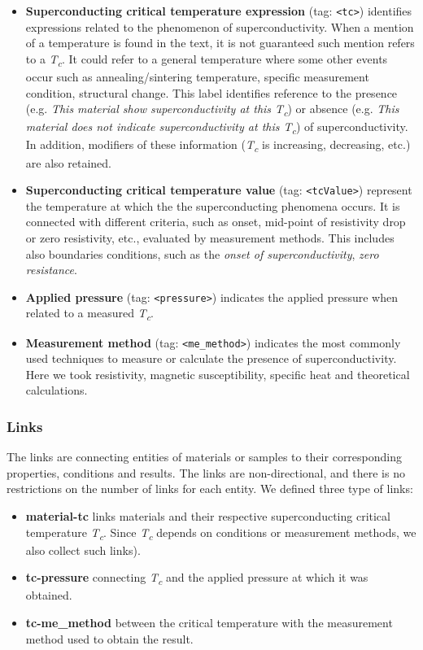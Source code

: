 \documentclass[fleqn,10pt]{wlscirep}
\begin{document}
\begin{itemize}
\item \textbf{Superconducting critical temperature expression} (tag: \texttt{<tc>}) identifies expressions related to the phenomenon of superconductivity. When a mention of a temperature is found in the text, it is not guaranteed such mention refers to a \textit{T\textsubscript{c}}. It could refer to a general temperature where some other events occur such as annealing/sintering temperature, specific measurement condition, structural change.
This label identifies reference to the presence (e.g. \textit{This material show superconductivity at this T\textsubscript{c}}) or absence (e.g. \textit{This material does not indicate superconductivity at this T\textsubscript{c}}) of superconductivity.
In addition, modifiers of these information (\textit{T\textsubscript{c}} is increasing, decreasing, etc.) are also retained. 

\item \textbf{Superconducting critical temperature value} (tag: \texttt{<tcValue>}) represent the temperature at which the the superconducting phenomena occurs. 
It is connected with different criteria, such as onset, mid-point of resistivity drop or zero resistivity, etc.,  evaluated by measurement methods.
This includes also boundaries conditions, such as the \textit{onset of superconductivity}, \textit{zero resistance}. 

\item \textbf{Applied pressure} (tag: \texttt{<pressure>}) indicates the applied pressure when  related to a measured \textit{T\textsubscript{c}}. 

\item \textbf{Measurement method} (tag: \texttt{<me\_method>}) indicates the most commonly used techniques to measure or calculate the presence of superconductivity. Here we took resistivity, magnetic susceptibility, specific heat and theoretical calculations. 
\end{itemize}
\FloatBarrier
\subsubsection*{Links}

The links are connecting entities of materials or samples to their corresponding properties, conditions and results. 
The links are non-directional, and there is no restrictions on the number of links for each entity. 
We defined three type of links:

\begin{itemize}
    \item \textbf{material-tc} links materials and their respective superconducting critical temperature \textit{T\textsubscript{c}}. Since \textit{T\textsubscript{c}} depends on conditions or measurement methods, we also collect such links).
    \item \textbf{tc-pressure} connecting \textit{T\textsubscript{c}} and the applied pressure at which it was obtained.
    \item \textbf{tc-me\_method} between the critical temperature with the measurement method used to obtain the result. 
\end{itemize}
\end{document}
